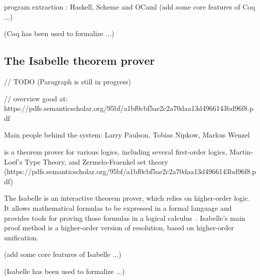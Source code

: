 \documentclass[article]{aaltoseries}
\begin{document}
program extraction : Haskell, Scheme and OCaml
(add some core features of Coq ...)

(Coq has been used to formalize ...)


\subsection{The Isabelle theorem prover}
\label{sec:prover_isabelle}

// TODO (Paragraph is still in progress)

// overview good at: https://pdfs.semanticscholar.org/95bf/a1bf0cbf5ae2c2a70daa13d4966143bd96f8.pdf

Main people behind the system: Larry Paulson, Tobias Nipkow, Markus Wenzel

is a theorem prover for various logics, including several first-order logics,
Martin-Loef’s Type Theory, and Zermelo-Fraenkel set theory  (https://pdfs.semanticscholar.org/95bf/a1bf0cbf5ae2c2a70daa13d4966143bd96f8.pdf)

The Isabelle is an interactive theorem prover, which relies on higher-order logic. It allows mathematical formulas to be expressed in a formal language and provides tools for proving those formulas in a logical calculus~\cite{tool_Isabelle}. Isabelle's main proof method is a higher-order version of resolution, based on higher-order unification.

(add some core features of Isabelle ...)

(Isabelle has been used to formalize ...)

\end{document}
